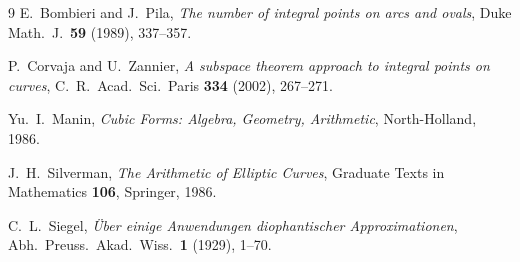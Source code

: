 \documentclass[12pt,a4paper]{article}
\theoremstyle{definition}
\begin{document}
\begin{thebibliography}{9}
  E.~Bombieri and J.~Pila,
  \emph{The number of integral points on arcs and ovals},
  Duke Math.\ J.\ \textbf{59} (1989), 337--357.

  P.~Corvaja and U.~Zannier,
  \emph{A subspace theorem approach to integral points on curves},
  C.\ R.\ Acad.\ Sci.\ Paris \textbf{334} (2002), 267--271.

  Yu.\ I.\ Manin,
  \emph{Cubic Forms: Algebra, Geometry, Arithmetic},
  North-Holland, 1986.

  J.~H.\ Silverman,
  \emph{The Arithmetic of Elliptic Curves},
  Graduate Texts in Mathematics \textbf{106}, Springer, 1986.

  C.~L.\ Siegel,
  \emph{\"Uber einige Anwendungen diophantischer Approximationen},
  Abh.\ Preuss.\ Akad.\ Wiss.\ \textbf{1} (1929), 1--70.
\end{thebibliography}
\end{document}
